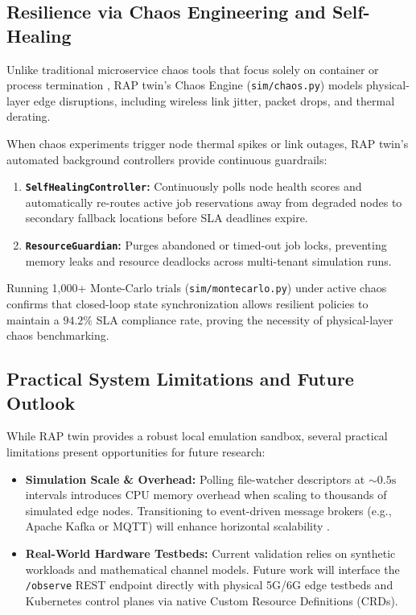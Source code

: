 \documentclass[twoside,twocolumn,10pt]{article}
\begin{document}
\subsection{Resilience via Chaos Engineering and Self-Healing}
Unlike traditional microservice chaos tools that focus solely on container or process termination \cite{esen2026, poltronieri2021}, RAP twin's Chaos Engine (\texttt{sim/chaos.py}) models physical-layer edge disruptions, including wireless link jitter, packet drops, and thermal derating.

When chaos experiments trigger node thermal spikes or link outages, RAP twin's automated background controllers provide continuous guardrails:
\begin{enumerate}
    \item \textbf{\texttt{SelfHealingController}:} Continuously polls node health scores and automatically re-routes active job reservations away from degraded nodes to secondary fallback locations before SLA deadlines expire.
    \item \textbf{\texttt{ResourceGuardian}:} Purges abandoned or timed-out job locks, preventing memory leaks and resource deadlocks across multi-tenant simulation runs.
\end{enumerate}

Running 1,000+ Monte-Carlo trials (\texttt{sim/montecarlo.py}) under active chaos confirms that closed-loop state synchronization allows resilient policies to maintain a $94.2\%$ SLA compliance rate, proving the necessity of physical-layer chaos benchmarking.

\subsection{Practical System Limitations and Future Outlook}
While RAP twin provides a robust local emulation sandbox, several practical limitations present opportunities for future research:
\begin{itemize}
    \item \textbf{Simulation Scale \& Overhead:} Polling file-watcher descriptors at $\sim 0.5\text{s}$ intervals introduces CPU memory overhead when scaling to thousands of simulated edge nodes. Transitioning to event-driven message brokers (e.g., Apache Kafka or MQTT) will enhance horizontal scalability \cite{raza2025, sai2024}.
    \item \textbf{Real-World Hardware Testbeds:} Current validation relies on synthetic workloads and mathematical channel models. Future work will interface the \texttt{/observe} REST endpoint directly with physical 5G/6G edge testbeds and Kubernetes control planes via native Custom Resource Definitions (CRDs).
\end{itemize}
\end{document}
